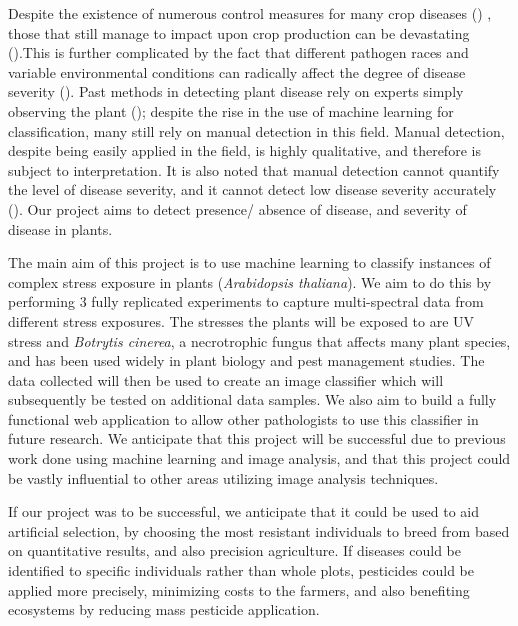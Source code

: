\documentclass[a4paper]{article}
\begin{document}
    
    Despite the existence of numerous control measures for many crop diseases (\cite{wood_sustainable_1996})
    , those that still manage to impact upon crop production can be devastating 
    (\cite{mccook_global_2006,woodham-smith_great_1962}).This is further complicated by the fact that different pathogen races and variable environmental conditions can radically affect the degree of disease severity (\cite{dangl_plant_2006, suzuki_reactive_2006}).  Past methods in detecting plant disease
    rely on experts simply observing the plant (\cite{singh_detection_2017}); despite the rise in 
    the use of machine learning for classification, many still rely on manual detection in this field. 
    Manual detection, despite being easily applied in the field, is highly qualitative, and therefore
    is subject to interpretation. It is also noted that manual detection cannot quantify the level of disease 
    severity, and it cannot detect low disease severity accurately (\cite{lowe_hyperspectral_2017}). Our 
    project aims to detect presence/ absence of disease, and severity of disease in plants.
    
    The main aim of this project is to use machine learning to classify instances of complex stress 
    exposure in plants (\textit{Arabidopsis thaliana}). We aim to do this by performing 3 fully replicated experiments to
    capture multi-spectral data from different stress exposures. The stresses the plants will be exposed to are UV stress and \textit{Botrytis cinerea}, a necrotrophic fungus that affects many plant species, and has been used widely in plant biology and pest management studies. The data collected will then be
    used to create an image classifier which will subsequently be tested on additional data samples.
    We also aim to build a fully functional web application to allow other pathologists to use this classifier in
    future research. We anticipate that this project will be successful due to previous work done 
    using machine learning and image analysis, and that this project could be vastly influential to other 
    areas utilizing image analysis techniques.
    
    If our project was to be successful, we anticipate that
    it could be used to aid artificial selection, by choosing the most resistant individuals to breed from
    based on quantitative results, and also precision agriculture. If diseases could be identified to 
    specific individuals rather than whole plots, pesticides could be applied more precisely, minimizing costs 
    to the farmers, and also benefiting ecosystems by reducing mass pesticide application.
\end{document}
